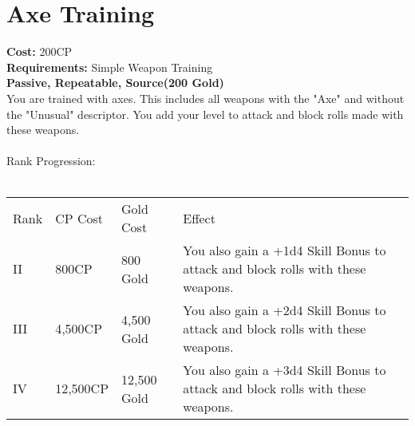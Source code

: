 \section{Axe Training}\label{perk:axeTraining}
\textbf{Cost:} 200CP\\
\textbf{Requirements:} Simple Weapon Training\\
\textbf{Passive, Repeatable, Source(200 Gold)}\\
You are trained with axes.
This includes all weapons with the "Axe" and without the "Unusual" descriptor.
You add your level to attack and block rolls made with these weapons.\\
\\
Rank Progression:\\
\\
\begin{longtable}{l | l | l | p{9cm}}
	Rank & CP Cost & Gold Cost & Effect\\
	II & 800CP & 800 Gold & You also gain a +1d4 Skill Bonus to attack and block rolls with these weapons.\\
	III & 4,500CP & 4,500 Gold & You also gain a +2d4 Skill Bonus to attack and block rolls with these weapons.\\
	IV & 12,500CP & 12,500 Gold & You also gain a +3d4 Skill Bonus to attack and block rolls with these weapons.\\
\end{longtable}